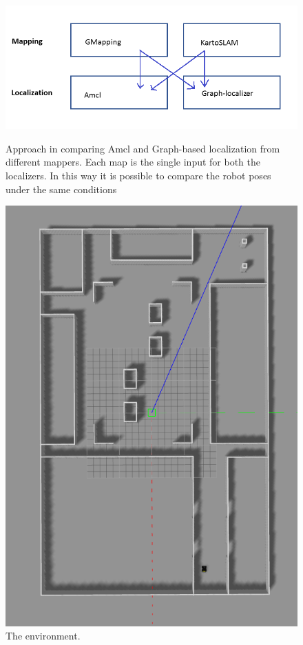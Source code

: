 \documentclass[11pt,a4paper]{article}
\begin{document}
\begin{figure}[h]
    \centering
    \begin{minipage}{.5\textwidth}
        \centering
        \includegraphics[width=0.9\linewidth, height=0.15\textheight]{figures/schema}
        \caption{Approach in comparing Amcl and Graph-based localization from different mappers. Each map is the single input for both the localizers. In this way it is possible to compare the robot poses under the same conditions}
        \label{fig:schema}
    \end{minipage}%
    \begin{minipage}{0.5\textwidth}
        \centering
        \includegraphics[width=0.7\linewidth, height=0.3\textheight]{figures/WZL}
        \caption{The environment.}
        \label{fig:env}
    \end{minipage}
 \end{figure}
\end{document}
